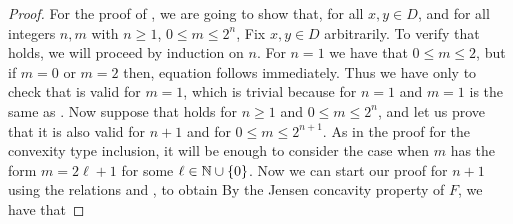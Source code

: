 \begin{proof}
For the proof of , we are going to show that, for all $x,y\in D$,
and for all integers $n,m$ with $n\geq 1$, $0\leq m\leq 2^n$,
Fix $x,y\in D$ arbitrarily. To verify that  holds, we will proceed by induction on $n$. For 
$n=1$ we have that $0\leq m\leq 2$, but if $m=0$ or $m=2$ then, equation  follows immediately. 
Thus we have only to check that  is valid for $m=1$, which is trivial because for $n=1$ and $m=1$
 is the same as . Now suppose that  holds for $n\geq1$ and $0\leq m \leq 2^n$, and 
let us prove that it is also valid for $n+1$ and for $0\leq m\leq 2^{n+1}$. As in the proof for the 
convexity type inclusion, it will be enough to consider the case when $m$ has the form $m=2\ell +1$ for some 
$\ell\in\mathbb{N}\cup\{0\}$. Now we can start our proof for $n+1$ using the relations  and , to obtain 
By the Jensen concavity property of $F$, we have that 

\end{proof}
